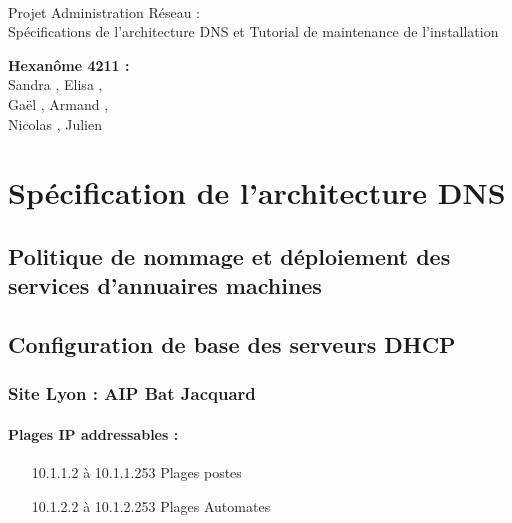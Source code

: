 \documentclass[a4paper]{article}
\begin{document}
\begin{titlepage}
	~ 
	\vfill
	\begin{center}
		\begin{Huge}
			Projet Administration Réseau : \\ Spécifications de l'architecture DNS et Tutorial de maintenance de l'installation\\
		\end{Huge}
	\vfill
		\textbf{Hexanôme 4211 :} 
			\\Sandra {}, Elisa , 
			\\Gaël , Armand , 
			\\Nicolas {}, Julien \\
	\vfill
	\end{center}
	\vfill
\end{titlepage}

\newpage
\tableofcontents
\newpage

\section{Spécification de l'architecture DNS}

\subsection{Politique de nommage et déploiement des services d'annuaires machines }



\subsection{Configuration de base des serveurs DHCP}


\subsubsection{Site Lyon : AIP Bat Jacquard }

\paragraph{Plages IP addressables :} 
\begin{itemize}
\item[10.1.1.2 à 10.1.1.253] Plages postes
\item[10.1.2.2 à 10.1.2.253] Plages Automates
\end{itemize}
\end{document}
